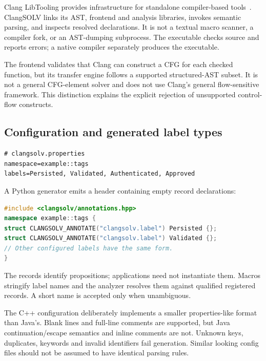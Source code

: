 \documentclass[11pt]{article}
\begin{document}
Clang LibTooling provides infrastructure for standalone compiler-based
tools~\cite{libtooling}. ClangSOLV links its AST, frontend and analysis
libraries, invokes semantic parsing, and inspects resolved declarations.
It is not a textual macro scanner, a compiler fork, or an AST-dumping
subprocess. The executable checks source and reports errors; a native
compiler separately produces the executable.

The frontend validates that Clang can construct a CFG for each checked
function, but its transfer engine follows a supported structured-AST subset.
It is not a general CFG-element solver and does not use Clang's general
flow-sensitive framework. This distinction explains the explicit rejection
of unsupported control-flow constructs.

\subsection{Configuration and generated label types}
\begin{lstlisting}
# clangsolv.properties
namespace=example::tags
labels=Persisted, Validated, Authenticated, Approved
\end{lstlisting}
A Python generator emits a header containing empty record declarations:
\begin{lstlisting}[language=C++]
#include <clangsolv/annotations.hpp>
namespace example::tags {
struct CLANGSOLV_ANNOTATE("clangsolv.label") Persisted {};
struct CLANGSOLV_ANNOTATE("clangsolv.label") Validated {};
// Other configured labels have the same form.
}
\end{lstlisting}
The records identify propositions; applications need not instantiate them.
Macros stringify label names and the analyzer resolves them against qualified
registered records. A short name is accepted only when unambiguous.

The C++ configuration deliberately implements a smaller properties-like
format than Java's. Blank lines and full-line comments are supported, but
Java continuation/escape semantics and inline comments are not. Unknown
keys, duplicates, keywords and invalid identifiers fail generation. Similar
looking config files should not be assumed to have identical parsing rules.
\end{document}
